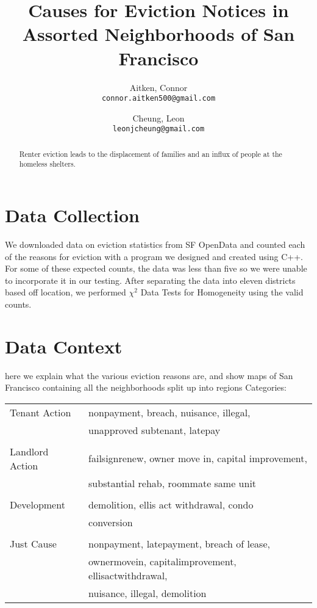 \documentclass[]{article}
\title{Causes for Eviction Notices in Assorted Neighborhoods of San Francisco}
\author{
Aitken, Connor\\
\texttt{connor.aitken500@gmail.com}
\and
Cheung, Leon\\
\texttt{leonjcheung@gmail.com}
}
\begin{document}
\maketitle

\begin{abstract}
Renter eviction leads to the displacement of families and an influx of people at the homeless shelters.  
\end{abstract}

\section{Data Collection}
We downloaded data on eviction statistics from SF OpenData and counted each of the reasons for eviction with a program we designed and created using C++. For some of these expected counts, the data was less than five so we were unable to incorporate it in our testing. After separating the data into eleven districts based off location, we performed $\chi ^{2}$ Data Tests for Homogeneity using the valid counts.
\section{Data Context}
here we explain what the various eviction reasons are, and show maps of San Francisco containing all the neighborhoods split up into regions
\newline \newline
Categories: \newline \newline
\begin{tabular}{l | l}

	Tenant Action    	& nonpayment, breach, nuisance, illegal,\\& unapproved subtenant, latepay \\							 	\\ 
	Landlord Action     & failsignrenew, owner move in, capital improvement, \\ & substantial rehab, roommate same unit 		\\				 		\\
	Development    		& demolition, ellis act withdrawal, condo \\ & conversion 			\\					\\ 
	Just Cause    		& nonpayment, latepayment, breach of lease, \\ &  ownermovein, capitalimprovement, ellisactwithdrawal, \\ & nuisance, illegal, demolition 				 			\\	
	\end{tabular}
\end{document}
